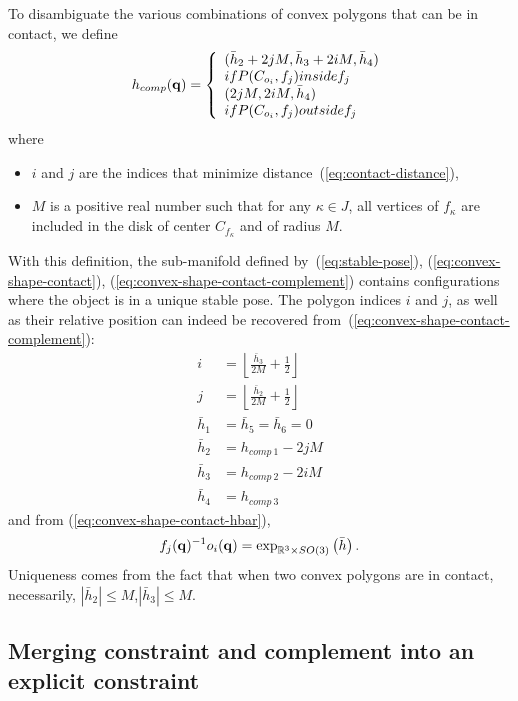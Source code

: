 To disambiguate the various combinations of convex polygons that can be in contact, we define
\begin{equation}\label{eq:convex-shape-contact-complement}
h_{comp}(\conf) = \left\{\begin{array}{l}(\bar{h}_2 + 2jM,\bar{h}_3 + 2iM,\bar{h}_4)\\
\mbox{if } P(C_{o_i},f_j)\mbox{ inside } f_j\\
(2jM,2iM,\bar{h}_4)\\
\mbox{if } P(C_{o_i},f_j)\mbox{ outside } f_j\end{array}\right.
\end{equation}
where
\begin{itemize}
\item $i$ and $j$ are the indices that minimize distance~(\ref{eq:contact-distance}),
\item $M$ is a positive real number such that for any $\kappa\in J$, all vertices of $f_\kappa$ are included in the disk of center $C_{f_\kappa}$ and of radius $M$.
\end{itemize}
With this definition, the sub-manifold defined by~(\ref{eq:stable-pose}), (\ref{eq:convex-shape-contact}), (\ref{eq:convex-shape-contact-complement}) contains configurations where the object is in a unique stable pose. The polygon indices $i$ and $j$, as well as their relative position can indeed be recovered from~(\ref{eq:convex-shape-contact-complement}):
\begin{align*}
  i &= \left\lfloor\frac{\bar{h}_3}{2M} + \frac{1}{2}\right\rfloor\\
  j &= \left\lfloor\frac{\bar{h}_2}{2M} + \frac{1}{2}\right\rfloor\\
  \bar{h}_1 &= \bar{h}_5 = \bar{h}_6 = 0\\
  \bar{h}_2 &= h_{comp\ 1} - 2jM\\
  \bar{h}_3 &= h_{comp\ 2} - 2iM\\
  \bar{h}_4 &= h_{comp\ 3}
\end{align*}
and from (\ref{eq:convex-shape-contact-hbar}),
$$
f_{j}(\mathbf{q})^{-1}o_i(\mathbf{q}) = \exp_{\mathbb{R}^3\times SO(3)}\left(\bar{h}\right).
$$
Uniqueness comes from the fact that when two convex polygons are in contact,
necessarily, $|\bar{h}_2| \leq M$,$|\bar{h}_3| \leq M$.

\subsection{Merging constraint and complement into an explicit constraint}
\label{subsec:explicit}

